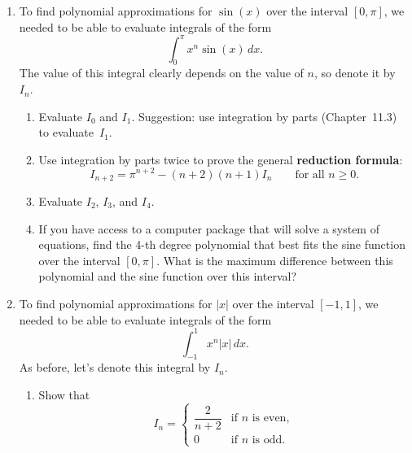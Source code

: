 \begin{enumerate}
\item To find polynomial approximations for $\sin(x)$ over the interval
$[0,\pi]$, we needed to be able to evaluate integrals of the form
\[
\int_0^{\pi} x^n \sin(x)\,dx.
\]
The value of this integral clearly depends on the value of $n$, so
denote it by~$I_n$.

\enlargethispage*{20pt}

  \begin{enumerate}
  \item Evaluate $I_0$ and $I_1$.  Suggestion: use integration by parts
(Chapter~11.3) to evaluate~$I_1$.



  \item Use integration by parts twice to prove the general {\bf
  reduction formula}:
\[
I_{n+2} = \pi^{n+2}-(n+2)(n+1)I_n \qquad \mbox{for all $n \ge 0$}.
\]




  \item Evaluate $I_2$, $I_3$, and $I_4$.




  \item If you have access to a computer package that will solve a system
of equations, find the 4-th degree polynomial that best fits the sine
function over the interval $[0,\pi]$.  What is the maximum difference
between this polynomial and the sine function over this interval?



\end{enumerate}
\item To find polynomial approximations for $|x|$ over the interval
$[-1,1]$, we needed to be able to evaluate integrals of the form
\[
\int_{-1}^{1} x^n |x|\,dx.
\]
As before, let's denote this integral by $I_n$.

  \begin{enumerate}
  \item Show that
\[
I_n  = \begin{cases}
\dfrac{2}{n+2} &\text{if $n$ is even}, \\[3pt]
0              &\text{if $n$ is odd}.
\end{cases}
\]



\end{enumerate}
\end{enumerate}
